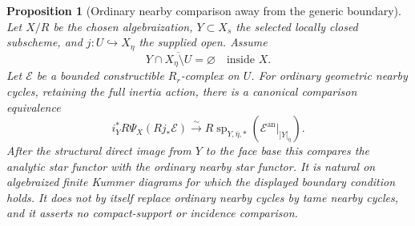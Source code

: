 \documentclass[11pt]{article}
\newtheorem{proposition}[theorem]{Proposition}
\theoremstyle{definition}
\theoremstyle{remark}
\begin{document}
\begin{proposition}[Ordinary nearby comparison away from the generic boundary]
\label{prop:frag-ordinary-nearby-boundary-disjoint}
Let $X/R$ be the chosen algebraization, $Y\subset X_s$ the selected
locally closed subscheme, and $j:U\hookrightarrow X_\eta$ the supplied
open.  Assume
\[
Y\cap\overline{X_\eta\setminus U}=\varnothing
\quad\text{inside }X.
\]
Let $\mathcal E$ be a bounded constructible $R_r$-complex on $U$.
For ordinary geometric nearby cycles, retaining the full inertia
action, there is a canonical comparison equivalence
\[
 i_Y^*R\Psi_X(Rj_*\mathcal E)
 \xrightarrow{\sim}
 R\operatorname{sp}_{Y,\bar\eta,*}
       (\mathcal E^{\mathrm{an}}|_{]Y[_{\bar\eta}}).
\]
After the structural direct image from $Y$ to the face base this
compares the analytic star functor with the \emph{ordinary} nearby
star functor.  It is natural on algebraized finite Kummer diagrams
for which the displayed boundary condition holds.  It does not by
itself replace ordinary nearby cycles by tame nearby cycles, and it
asserts no compact-support or incidence comparison.
\end{proposition}
\end{document}
